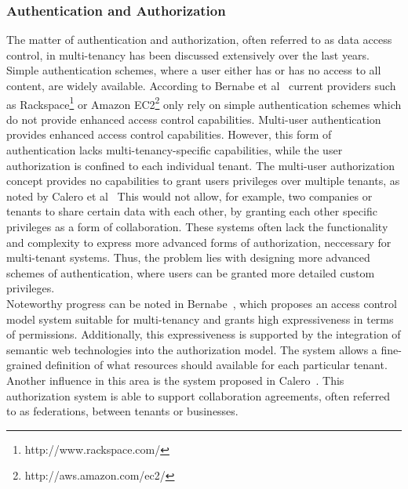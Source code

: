 \subsubsection{Authentication and Authorization}
The matter of authentication and authorization, often referred to as data access control, in multi-tenancy has been discussed extensively over the last years. 
Simple authentication schemes, where a user either has or has no access to all content, are widely available.
According to Bernabe et al~\cite{Bernabe2012Auth} current providers such as Rackspace\footnote{http://www.rackspace.com/} or Amazon EC2\footnote{http://aws.amazon.com/ec2/} only rely on simple authentication schemes which do not provide enhanced access control capabilities. 
Multi-user authentication provides enhanced access control capabilities.
However, this form of authentication lacks multi-tenancy-specific capabilities, while the user authorization is confined to each individual tenant. %
The multi-user authorization concept provides no capabilities to grant users privileges over multiple tenants, as noted by Calero et al~\cite{Calero2010Auth}
This would not allow, for example, two companies or tenants to share certain data with each other, by granting each other specific privileges as a form of collaboration.
These systems often lack the functionality and complexity to express more advanced forms of authorization, neccessary for multi-tenant systems.
Thus, the problem lies with designing more advanced schemes of authentication, where users can be granted more detailed custom privileges.\\

Noteworthy progress can be noted in Bernabe~\cite{Bernabe2012Auth}, which proposes an access control model system suitable for multi-tenancy and grants high expressiveness in terms of permissions. 
Additionally, this expressiveness is supported by the integration of semantic web technologies into the authorization model. 
The system allows a fine-grained definition of what resources should available for each particular tenant. 
Another influence in this area is the system proposed in Calero~\cite{Calero2010Auth}. 
This authorization system is able to support collaboration agreements, often referred to as federations, between tenants or businesses.

